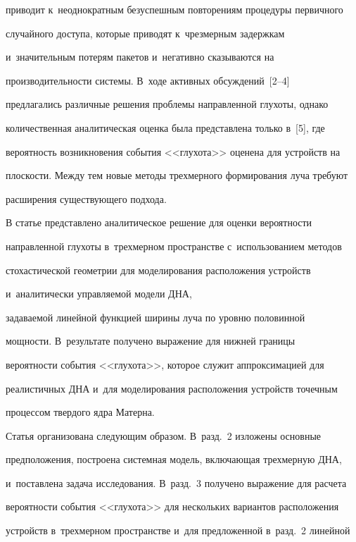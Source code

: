 приводит к~неоднократным безуспешным повторениям процедуры первичного 


случайного доступа, которые приводят к~чрезмерным задержкам 


и~значительным потерям пакетов и~негативно сказываются на 


производительности системы. В~ходе активных обсуждений~[2--4] 


предлагались различные решения проблемы направленной глухоты, однако 


количественная аналитическая оценка была представлена только в~[5], где 


вероятность возникновения события <<глухота>> оценена для устройств на 


плоскости. Между тем новые методы трехмерного формирования луча требуют 


расширения существующего подхода.


  


  В статье представлено аналитическое решение для оценки вероятности 


на\-прав\-лен\-ной глухоты в~трехмерном пространстве с~использованием методов 


стохастической геометрии для моделирования расположения устройств 


и~аналитически управляемой модели ДНА, 


задаваемой линейной функцией ширины луча по уровню половинной 


мощности. В~результате получено выражение для нижней границы 


вероятности события <<глухота>>, которое служит аппроксимацией для 


реалистичных ДНА и~для моделирования расположения устройств точечным 


процессом твердого ядра Матерна.


  


  Статья организована следующим образом. В~разд.~2 изложены основные 


предположения, построена системная модель, включающая трехмерную ДНА, 


и~поставлена задача исследования. В~разд.~3 получено выражение для расчета 


вероятности события <<глухота>> для нескольких вариантов расположения 


устройств в~трехмерном пространстве и~для предложенной в~разд.~2 линейной 


